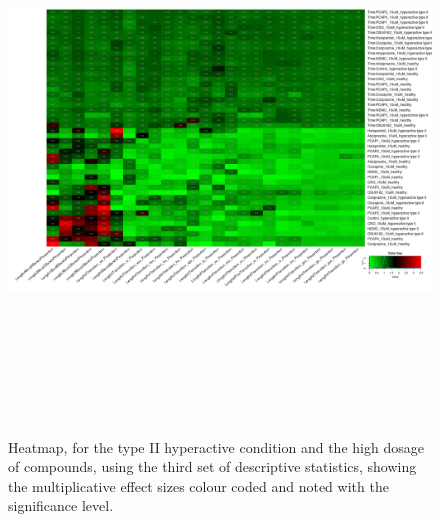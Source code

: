 \documentclass[a4paper,12pt]{article}
\begin{document}
\begin{figure}[h!]
\begin{center}
\includegraphics[width=16cm,height=15cm]{DarkPTZ_heatmap_10_microM_DarkPTZ_B1MAP.png}
\caption{Heatmap, for the type II hyperactive condition and the high dosage of compounds, using the third set of descriptive statistics, showing the multiplicative effect sizes colour coded and noted with the significance level.}
\end{center}
\end{figure}
\end{document}
